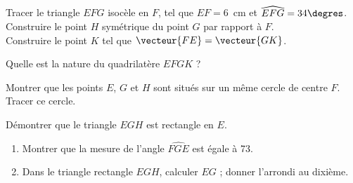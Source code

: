 \begin{myenumerate}
\item Tracer le triangle $EFG$ isocèle en $F$, tel que $EF= 6$~cm et $\widehat{EFG}=34\degres$.\\
Construire le point $H$ symétrique du point $G$ par rapport à $F$.\\
Construire le point $K$ tel que $\vecteur{FE} = \vecteur{GK}$.
\item Quelle est la nature du quadrilatère $EFGK$ ?
\item Montrer que les points $E$, $G$ et $H$ sont situés sur un même cercle de centre $F$. Tracer ce cercle.
\item Démontrer que le triangle $EGH$ est rectangle en $E$.
\item \begin{enumerate}
\item Montrer que la mesure de l'angle $\widehat{FGE}$ est égale à 73\degres.
\item Dans le triangle rectangle $EGH$, calculer $EG$ ;  donner l'arrondi au dixième.
\end{enumerate}
\end{myenumerate}